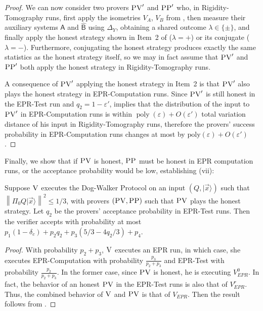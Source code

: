 \documentclass{toc}
\newcommand{\ket}[1]{|#1\rangle}
\DeclareMathOperator{\poly}{poly}
\newcommand{\reg}[1]{{\textsf{#1}}}
\newcommand{\norm}[1]{\left\|#1\right\|}
\newcommand{\eps}{\varepsilon}
\newcommand{\ver}{\textsc{V}}
\newcommand{\pv}{\textsc{PV}}
\newcommand{\pp}{\textsc{PP}}
\begin{document}
\begin{proof}
We can now consider two provers $\pv'$ and $\pp'$ who, in Rigidity-Tomography runs, first apply the isometries $V_A$, $V_B$ from , then  measure their auxiliary systems $\hat{\reg{A}}$ and $\hat{\reg{B}}$ using $\Delta_Y$, obtaining a shared outcome $\lambda\in\{\pm\}$, and finally apply the honest strategy shown in Item~2 of  ($\lambda=+$) or its conjugate ($\lambda = -$). Furthermore, conjugating the honest strategy produces exactly the same statistics as the honest strategy itself, so we may in fact assume that $\pv'$ and $\pp'$ both apply the honest strategy in Rigidity-Tomography runs. 


A consequence of $\pv'$ applying the honest strategy in  Item~2 is that $\pv'$ also plays the honest strategy in EPR-Computation runs. Since $\pv'$ is still honest in the EPR-Test run and $q_2 = 1-\eps'$,  implies that the distribution of the input to $\pv'$ in EPR-Computation runs is within $\poly(\eps)+O(\eps')$ total variation distance of his input in
Rigidity-Tomography runs, therefore the provers' success probability in EPR-Computation runs changes at most by $\mathrm{poly}(\eps)+O(\eps')$. 
\end{proof}


Finally, we show that if $\pv$ is honest, $\pp$ must be honest in EPR computation runs, or the acceptance probability would be low, establishing (vii):
\begin{lemma}\label{lem:PP-3}
Suppose $\ver$ executes the Dog-Walker Protocol on an input $(Q,\ket{\vec{x}})$ such that $\norm{\Pi_0 Q\ket{\vec{x}}}^2\leq 1/3$, with provers $(\pv,\pp)$ such that $\pv$ plays the honest strategy. Let $q_2$ be the provers' acceptance probability in EPR-Test runs. Then the verifier accepts with probability at most
  $p_1(1-\delta_c) +p_2q_2+p_3(5/3-4q_2/3)+p_4$. 
\end{lemma}
\begin{proof}
With probability $p_2+p_3$, $\ver$ executes an EPR run, in which case, she executes EPR-Computation with probability $\frac{p_3}{p_2+p_3}$ and EPR-Test with probability $\frac{p_2}{p_2+p_3}$. In the former case, since $\pv$ is honest, he is executing $V_{EPR}^0$. In fact, the behavior of an honest $\pv$ in the EPR-Test runs is also that of $V_{EPR}^r$. Thus, the combined behavior of $\ver$ and $\pv$ is that of $V_{EPR}$. Then the result follows from . 
\end{proof}
\end{document}
